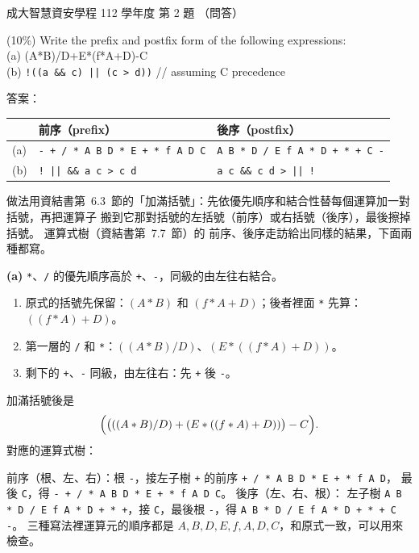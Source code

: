 \begin{pastexam}[label={px:ncku-112-isec-ds-02}]{成大智慧資安學程 112 學年度 第 2 題}
（問答）

(10\%) Write the prefix and postfix form of the following expressions:\\
(a) (A*B)/D+E*(f*A+D)-C\\
(b) \texttt{!((a \&\& c) || (c > d))} \qquad\qquad // assuming C precedence
\end{pastexam}

\begin{pastsoln}
答案：
\begin{center}
\begin{tabular}{lll}
\toprule
 & 前序（prefix） & 後序（postfix） \\
\midrule
(a) & \texttt{- + / * A B D * E + * f A D C} & \texttt{A B * D / E f A * D + * + C -} \\
(b) & \texttt{! || \&\& a c > c d} & \texttt{a c \&\& c d > || !} \\
\bottomrule
\end{tabular}
\end{center}
做法用資結書第~6.3~節的「加滿括號」：先依優先順序和結合性替每個運算加一對括號，再把運算子
搬到它那對括號的左括號（前序）或右括號（後序），最後擦掉括號。 運算式樹（資結書第~7.7~節）的
前序、後序走訪給出同樣的結果，下面兩種都寫。

\textbf{(a)} \texttt{*}、\texttt{/} 的優先順序高於 \texttt{+}、\texttt{-}，同級的由左往右結合。
\begin{enumerate}
\item 原式的括號先保留：$(A*B)$ 和 $(f*A+D)$；後者裡面 \texttt{*} 先算：$((f*A)+D)$。
\item 第一層的 \texttt{/} 和 \texttt{*}：$((A*B)/D)$、$(E*((f*A)+D))$。
\item 剩下的 \texttt{+}、\texttt{-} 同級，由左往右：先 \texttt{+} 後 \texttt{-}。
\end{enumerate}
加滿括號後是
\[
\Bigl(\bigl(((A*B)/D) + (E*((f*A)+D))\bigr) - C\Bigr).
\]
對應的運算式樹：
\begin{center}
\end{center}
前序（根、左、右）：根 \texttt{-}，接左子樹 \texttt{+} 的前序 \texttt{+ / * A B D * E + * f A D}，
最後 \texttt{C}，得 \texttt{- + / * A B D * E + * f A D C}。 後序（左、右、根）：
左子樹 \texttt{A B * D / E f A * D + * +}，接 \texttt{C}，最後根 \texttt{-}，得
\texttt{A B * D / E f A * D + * + C -}。 三種寫法裡運算元的順序都是
$A, B, D, E, f, A, D, C$，和原式一致，可以用來檢查。


\end{pastsoln}
